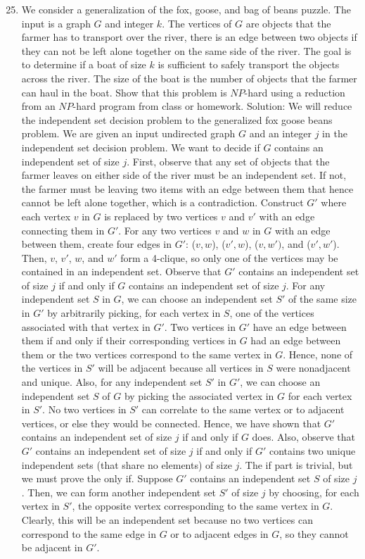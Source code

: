 \documentclass{article}
\begin{document}
\begin{enumerate}
\setcounter{enumi}{24}
\item We consider a generalization of the fox, goose, and bag of beans puzzle. The input is a graph $G$ and integer $k$. The vertices of $G$ are objects that the farmer has to transport over the river, there is an edge between two objects if they can not be left alone together on the same side of the river. The goal is to determine if a boat of size $k$ is sufficient to safely transport the objects across the river. The size of the boat is the number of objects that the farmer can haul in the boat. Show that this problem is $NP$-hard using a reduction from an $NP$-hard program from class or homework.
\newline
\newline Solution: We will reduce the independent set decision problem to the generalized fox goose beans problem. We are given an input undirected graph $G$ and an integer $j$ in the independent set decision problem. We want to decide if $G$ contains an independent set of size $j$. First, observe that any set of objects that the farmer leaves on either side of the river must be an independent set. If not, the farmer must be leaving two items with an edge between them that hence cannot be left alone together, which is a contradiction. Construct $G'$ where each vertex $v$ in $G$ is replaced by two vertices $v$ and $v'$ with an edge connecting them in $G'$. For any two vertices $v$ and $w$ in $G$ with an edge between them, create four edges in $G'$: ($v,w$), ($v',w$), ($v,w')$, and ($v',w'$). Then, $v$, $v'$, $w$, and $w'$ form a 4-clique, so only one of the vertices may be contained in an independent set.
\newline
\newline Observe that $G'$ contains an independent set of size $j$ if and only if $G$ contains an independent set of size $j$. For any independent set $S$ in $G$, we can choose an independent set $S'$ of the same size in $G'$ by arbitrarily picking, for each vertex in $S$, one of the vertices associated with that vertex in $G'$. Two vertices in $G'$ have an edge between them if and only if their corresponding vertices in $G$ had an edge between them or the two vertices correspond to the same vertex in $G$. Hence, none of the vertices in $S'$ will be adjacent because all vertices in $S$ were nonadjacent and unique. Also, for any independent set $S'$ in $G'$, we can choose an independent set $S$ of $G$ by picking the associated vertex in $G$ for each vertex in $S'$. No two vertices in $S'$ can correlate to the same vertex or to adjacent vertices, or else they would be connected. Hence, we have shown that $G'$ contains an independent set of size $j$ if and only if $G$ does. Also, observe that $G'$ contains an independent set of size $j$ if and only if $G'$ contains two unique independent sets (that share no elements) of size $j$. The if part is trivial, but we must prove the only if. Suppose $G'$ contains an independent set $S$ of size $j$. Then, we can form another independent set $S'$ of size $j$ by choosing, for each vertex in $S'$, the opposite vertex corresponding to the same vertex in $G$. Clearly, this will be an independent set because no two vertices can correspond to the same edge in $G$ or to adjacent edges in $G$, so they cannot be adjacent in $G'$.

\end{enumerate}
\end{document}
